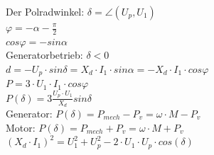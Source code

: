 \begin{minipage}{0.5 \linewidth}
Der Polradwinkel: $\delta = \angle(U_p, U_1)$ \\

$\varphi = -\alpha - \frac{\pi}{2}$\\
$cos\varphi = -sin\alpha$\\

Generatorbetrieb: $\delta < 0$ \\

$d = -U_p \cdot sin\delta = X_d\cdot I_1 \cdot sin\alpha = -X_d\cdot I_1\cdot cos\varphi$ \\

$P = 3 \cdot U_1 \cdot I_1 \cdot cos\varphi$\\

$P(\delta) = 3 \frac{U_p\cdot U_1}{X_d} sin\delta$\\

Generator: $P(\delta) = P_{mech} - P_v = \omega \cdot M - P_v$ \\

Motor: $P(\delta) = P_{mech} + P_v = \omega \cdot M + P_v$ \\

$(X_d \cdot I_1)^2 = U_1^2 + U_p^2 -2 \cdot U_1 \cdot U_p \cdot cos(\delta)$
\end{minipage}


